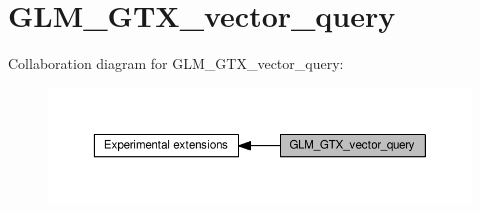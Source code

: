 \hypertarget{group__gtx__vector__query}{}\section{G\+L\+M\+\_\+\+G\+T\+X\+\_\+vector\+\_\+query}
\label{group__gtx__vector__query}
Collaboration diagram for G\+L\+M\+\_\+\+G\+T\+X\+\_\+vector\+\_\+query\+:
\nopagebreak
\begin{figure}[H]
\begin{center}
\leavevmode
\includegraphics[width=350pt]{dc/da4/group__gtx__vector__query}
\end{center}
\end{figure}
